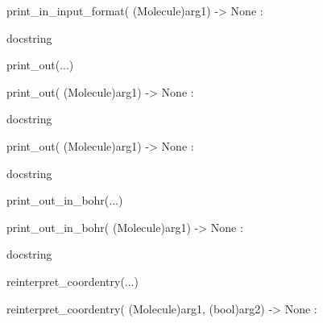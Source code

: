 \documentclass[letterpaper,10pt,english]{sphinxmanual}
\begin{document}
\begin{description}
\begin{description}
\begin{DUlineblock}{0em}
\begin{DUlineblock}{\DUlineblockindent}
\item[] print\_in\_input\_format( (Molecule)arg1) -\textgreater{} None :
\item[]
\begin{DUlineblock}{\DUlineblockindent}
\item[] docstring
\item[] 
\end{DUlineblock}
\end{DUlineblock}
\item[] print\_out(...)
\item[]
\begin{DUlineblock}{\DUlineblockindent}
\item[] print\_out( (Molecule)arg1) -\textgreater{} None :
\item[]
\begin{DUlineblock}{\DUlineblockindent}
\item[] docstring
\item[] 
\end{DUlineblock}
\item[] print\_out( (Molecule)arg1) -\textgreater{} None :
\item[]
\begin{DUlineblock}{\DUlineblockindent}
\item[] docstring
\item[] 
\end{DUlineblock}
\end{DUlineblock}
\item[] print\_out\_in\_bohr(...)
\item[]
\begin{DUlineblock}{\DUlineblockindent}
\item[] print\_out\_in\_bohr( (Molecule)arg1) -\textgreater{} None :
\item[]
\begin{DUlineblock}{\DUlineblockindent}
\item[] docstring
\item[] 
\end{DUlineblock}
\end{DUlineblock}
\item[] reinterpret\_coordentry(...)
\item[]
\begin{DUlineblock}{\DUlineblockindent}
\item[] reinterpret\_coordentry( (Molecule)arg1, (bool)arg2) -\textgreater{} None :
\item[]

\end{DUlineblock}
\end{DUlineblock}
\end{description}
\end{description}
\end{document}
